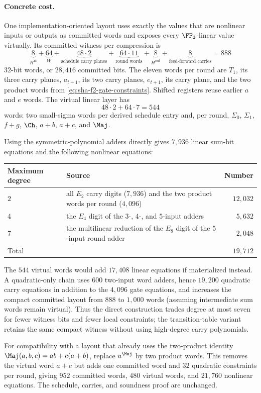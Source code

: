 \paragraph{Concrete cost.}
One implementation-oriented layout uses exactly the values that are nonlinear
inputs or outputs as committed words and exposes every $\FF_2$-linear value
virtually.  Its committed witness per compression is
\begin{equation}\label{eq:sha-f2-witness-cost}
\underbrace{8}_{H^{\mathrm{in}}}
+\underbrace{64}_{W}
+\underbrace{48\cdot2}_{\text{schedule carry planes}}
+\underbrace{64\cdot11}_{\text{round words}}
+\underbrace{8}_{H^{\mathrm{out}}}
+\underbrace{8}_{\text{feed-forward carries}}
=888
\end{equation}
$32$-bit words, or $28{,}416$ committed bits.  The eleven words per round
are $T_1$, its three carry planes, $a_{t+1}$, its two carry planes,
$e_{t+1}$, its carry plane, and the two product words from
\eqref{eq:sha-f2-gate-constraints}.  Shifted registers reuse earlier $a$ and
$e$ words.  The virtual linear layer has
\[
  48\cdot2+64\cdot7=544
\]
words: two small-sigma words per derived schedule entry and, per round,
$\Sigma_0$, $\Sigma_1$, $f+g$, $\Ch$, $a+b$, $a+c$, and $\Maj$.

Using the symmetric-polynomial adders directly gives $7{,}936$ linear
sum-bit equations and the following nonlinear equations:
\begin{center}
\begin{tabular}{@{}l>{\raggedright\arraybackslash}p{}r@{}}
\toprule
Maximum degree & Source & Number\\
\midrule
$2$ & all $E_2$ carry digits ($7{,}936$) and the two product words per
      round ($4{,}096$)
    & $12{,}032$\\
$4$ & the $E_4$ digit of the $3$-, $4$-, and $5$-input adders
    & $5{,}632$\\
$7$ & the multilinear reduction of the $E_8$ digit of the $5$-input round adder
    & $2{,}048$\\
\midrule
Total & & $19{,}712$\\
\bottomrule
\end{tabular}
\end{center}
The $544$ virtual words would add $17{,}408$ linear equations if
materialized instead.  A quadratic-only chain uses $600$ two-input word
adders, hence $19{,}200$ quadratic carry equations in addition to the
$4{,}096$ gate equations, and increases the compact committed layout from
$888$ to $1{,}000$ words (assuming intermediate sum words remain virtual).
Thus the direct construction trades degree at most seven for fewer witness
bits and fewer local constraints; the transition-table variant retains the
same compact witness without using high-degree carry polynomials.

For compatibility with a layout that already uses the two-product identity
$\Maj(a,b,c)=ab+c(a+b)$, replace $u^{\Maj}$ by two product words.  This removes
the virtual word $a+c$ but adds one committed word and $32$ quadratic
constraints per round, giving $952$ committed words, $480$ virtual words, and
$21{,}760$ nonlinear equations.  The schedule, carries, and soundness proof
are unchanged.
